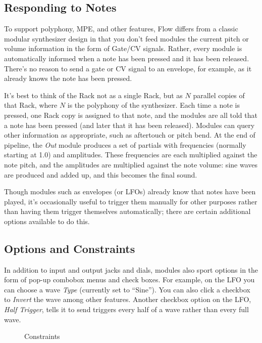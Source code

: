 \documentclass{article}
\newcommand\name{Flow}
\begin{document}
\subsection{Responding to Notes} To support polyphony, MPE, and other features, {\name} differs from a classic modular synthesizer design in that you don't feed modules the current pitch or volume information in the form of Gate/CV signals. Rather, every module is automatically informed when a note has been pressed and it has been released.  There's no reason to send a gate or CV signal to an envelope, for example, as it already knows the note has been pressed.

It's best to think of the Rack not as a single Rack, but as \(N\) parallel copies of that Rack, where \(N\) is the polyphony of the synthesizer.  Each time a note is pressed, one Rack copy is assigned to that note, and the modules are all told that a note has been pressed (and later that it has been released).  Modules can query other information as appropriate, such as aftertouch or pitch bend.  At the end of pipeline, the {\it Out} module produces a set of partials with frequencies (normally starting at 1.0) and amplitudes.  These frequencies are each multiplied against the note pitch, and the amplitudes are multiplied against the note volume: sine waves are produced and added up, and this becomes the final sound.

Though modules such as envelopes (or LFOs) already know that notes have been played, it's occasionally useful to trigger them manually for other purposes rather than having them trigger themselves automatically; there are certain additional options available to do this.

\subsection{Options and Constraints}


In addition to input and output jacks and dials, modules also sport options in the form of pop-up combobox menus and check boxes.  For example, on the LFO you can choose a wave {\it Type} (currently set to ``Sine'').  You can also click a checkbox to {\it Invert} the wave among other features.  Another checkbox option on the LFO, {\it Half Trigger}, tells it to send triggers every half of a wave rather than every full wave.

\begin{figure}
\vspace{-2em}
\caption{Constraints}
\vspace{-1em}
\label{constraintfacility}
\end{figure}
\end{document}
